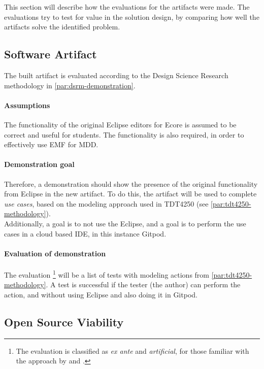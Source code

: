 
This section will describe how the evaluations for the artifacts were made.
The evaluations try to test for value in the solution design, by comparing how well the artifacts solve the identified problem.

\subsection{Software Artifact}

The built artifact is evaluated according to the Design Science Research methodology in \cref{par:dsrm-demonstration}.

\paragraph{Assumptions}
The functionality of the original \gls{Eclipse} editors for \gls{Ecore} is assumed to be correct and useful for students.
The functionality is also required, in order to effectively use \acrshort{EMF} for \acrfull{MDD}.

\paragraph{Demonstration goal}
Therefore, a demonstration should show the presence of the original functionality from \gls{Eclipse} in the new artifact.
To do this, the artifact will be used to complete \textit{use cases}, based on the modeling approach used in \gls{TDT4250} (see \cref{par:tdt4250-methodology}).\\


Additionally, a goal is to not use the \gls{Eclipse}, and a goal is to perform the use cases in a \gls{cloud} based \gls{IDE}, in this instance \gls{Gitpod}.


\paragraph{Evaluation of demonstration}
The evaluation%
\footnote{The evaluation is classified as \textit{ex ante} and \textit{artificial}, for those familiar with the approach by \textcite{sonnenbergEvaluationsScienceArtificial2012} and \cite{venableComprehensiveFrameworkEvaluation2012}.} 
will be a list of tests with modeling actions from \cref{par:tdt4250-methodology}.
A test is successful if the tester (the author) can perform the action, and without using \gls{Eclipse} and also doing it in \gls{Gitpod}.


\subsection{Open Source Viability}

